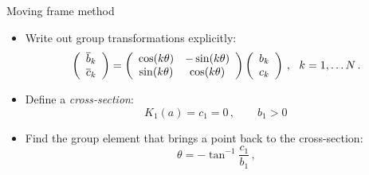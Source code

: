 \documentclass{beamer}
\begin{document}

%

\begin{frame}{Moving frame method}
  \begin{block}{}
	\begin{itemize}
	\item Write out group transformations explicitly:
	\[
	 \left(\barr{cc} \overline{b}_k \\ \overline{c}_k\earr \right)=\left(\barr{cc}
			    			\cos(k\theta) & -\sin(k\theta)\\
						\sin(k\theta) & \cos(k\theta)\\
			   			\earr	
						\right)\left(\barr{cc} b_k \\ c_k\earr\right)\,,\ \ k=1,\ldots N\,.
	\]
	\item Define a \emph{cross-section}:
	\[
 		K_1(a)=c_1=0\,,\qquad b_1>0\,
	\]
	\item Find the group element that brings a point back to the cross-section:
	\[
		\theta=-\tan^{-1}\frac{c_1}{b_1}\,,	
	\]
	\end{itemize}
  \end{block}
\end{frame}
\end{document}
